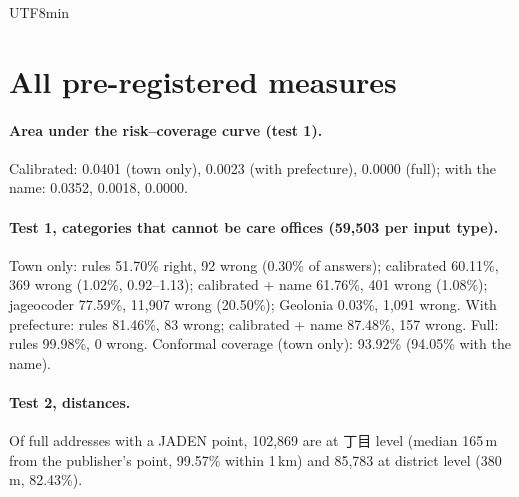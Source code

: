 \documentclass[10pt]{article}
\begin{document}
\begin{CJK}{UTF8}{min}
\appendix
\section{All pre-registered measures}

\paragraph{Area under the risk--coverage curve (test 1).} Calibrated: 0.0401 (town only), 0.0023 (with
prefecture), 0.0000 (full); with the name: 0.0352, 0.0018, 0.0000.

\paragraph{Test 1, categories that cannot be care offices (59,503 per input type).} Town only: rules
51.70\% right, 92 wrong (0.30\% of answers); calibrated 60.11\%, 369 wrong (1.02\%, 0.92--1.13);
calibrated + name 61.76\%, 401 wrong (1.08\%); jageocoder 77.59\%, 11,907 wrong (20.50\%); Geolonia 0.03\%,
1,091 wrong. With prefecture: rules 81.46\%, 83 wrong; calibrated + name 87.48\%, 157 wrong. Full: rules
99.98\%, 0 wrong. Conformal coverage (town only): 93.92\% (94.05\% with the name).

\paragraph{Test 2, distances.} Of full addresses with a JADEN point, 102,869 are at 丁目 level (median 165\,m
from the publisher's point, 99.57\% within 1\,km) and 85,783 at district level (380\,m, 82.43\%).


\end{CJK}
\end{document}
